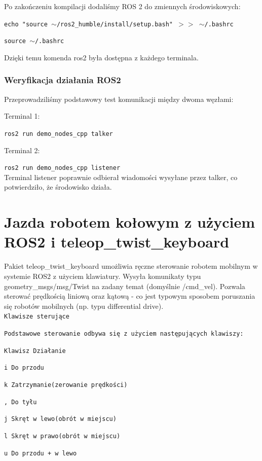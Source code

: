 \documentclass[12pt]{article}
\begin{document}
Po zakończeniu kompilacji dodaliśmy ROS 2 do zmiennych środowiskowych:

\texttt{echo "source $\sim$/ros2\_humble/install/setup.bash" $>>$ $\sim$/.bashrc}

\texttt{source $\sim$/.bashrc}

Dzięki temu komenda ros2 była dostępna z każdego terminala.

\subsubsection{Weryfikacja działania ROS2 }

Przeprowadziliśmy podstawowy test komunikacji między dwoma węzłami:

Terminal 1:

\texttt{ros2 run demo\_nodes\_cpp talker}


Terminal 2:

\texttt{ros2 run demo\_nodes\_cpp listener}
\\
Terminal listener poprawnie odbierał wiadomości wysyłane przez talker, co potwierdziło, że środowisko działa.

\newpage


\section{Jazda robotem kołowym z użyciem ROS2 i teleop\_twist\_keyboard}

\noindent Pakiet teleop\_twist\_keyboard umożliwia ręczne sterowanie robotem mobilnym w systemie ROS2 z użyciem klawiatury. Wysyła komunikaty typu geometry\_msgs/msg/Twist na zadany temat (domyślnie /cmd\_vel). Pozwala sterować prędkością liniową oraz kątową - co jest typowym sposobem poruszania się robotów mobilnych (np. typu differential drive).\\

\texttt{Klawisze sterujące}

\texttt{Podstawowe sterowanie odbywa się z użyciem następujących klawiszy:}

\texttt{Klawisz  Działanie}

\texttt{i  Do przodu}

\texttt{k  Zatrzymanie(zerowanie prędkości)}

\texttt{,  Do tyłu}

\texttt{j  Skręt w lewo(obrót w miejscu)}

\texttt{l  Skręt w prawo(obrót w miejscu)}

\texttt{u Do przodu + w lewo}
\end{document}
